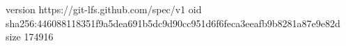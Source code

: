 version https://git-lfs.github.com/spec/v1
oid sha256:446088118351f9a5dea691b5dc9d90cc951d6f6feca3eeafb9b8281a87e9e82d
size 174916
